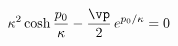 \begin{equation}\label{45}
 \kappa^2\cosh\frac{p_0}{\kappa} - \frac{\vp}2\, e^{p_0/\kappa} =0
\end{equation}

